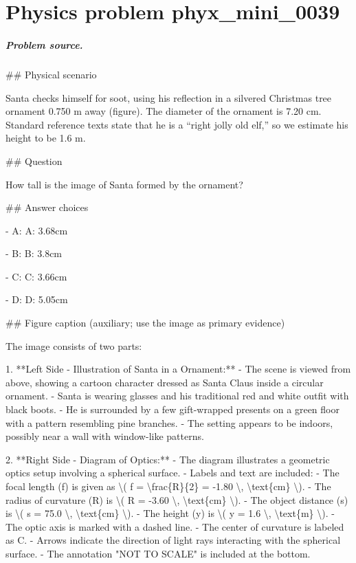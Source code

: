 
\chapter{Physics problem phyx\_mini\_0039}
\label{ch:PhyXMiniProblems_problem_phyx_mini_0039}

\paragraph{Problem source.}
\#\# Physical scenario

Santa checks himself for soot, using his reflection in a silvered Christmas tree ornament 0.750 m away (figure). The diameter of the ornament is 7.20 cm. Standard reference texts state that he is a “right jolly old elf,” so we estimate his height to be 1.6 m.

\#\# Question

How tall is the image of Santa formed by the ornament?

\#\# Answer choices

- A: A: 3.68cm

- B: B: 3.8cm

- C: C: 3.66cm

- D: D: 5.05cm

\#\# Figure caption (auxiliary; use the image as primary evidence)

The image consists of two parts:

1. **Left Side - Illustration of Santa in a Ornament:**
   - The scene is viewed from above, showing a cartoon character dressed as Santa Claus inside a circular ornament.
   - Santa is wearing glasses and his traditional red and white outfit with black boots.
   - He is surrounded by a few gift-wrapped presents on a green floor with a pattern resembling pine branches. 
   - The setting appears to be indoors, possibly near a wall with window-like patterns.

2. **Right Side - Diagram of Optics:**
   - The diagram illustrates a geometric optics setup involving a spherical surface.
   - Labels and text are included:
     - The focal length (f) is given as \textbackslash{}( f = \textbackslash{}frac\{R\}\{2\} = -1.80 \textbackslash{}, \textbackslash{}text\{cm\} \textbackslash{}).
     - The radius of curvature (R) is \textbackslash{}( R = -3.60 \textbackslash{}, \textbackslash{}text\{cm\} \textbackslash{}).
     - The object distance (s) is \textbackslash{}( s = 75.0 \textbackslash{}, \textbackslash{}text\{cm\} \textbackslash{}).
     - The height (y) is \textbackslash{}( y = 1.6 \textbackslash{}, \textbackslash{}text\{m\} \textbackslash{}).
     - The optic axis is marked with a dashed line.
     - The center of curvature is labeled as C.
   - Arrows indicate the direction of light rays interacting with the spherical surface.
   - The annotation "NOT TO SCALE" is included at the bottom.

